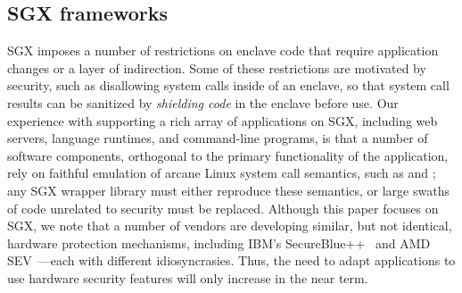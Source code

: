 \begin{comment}
Unfortunately, the limited POSIX support in the \sdk{} infrastructure really strikes
the opportunity of fine-grained partitioning.
The lack of POSIX APIs in the infrastructure is fundamental, due to the restriction
on OS interaction from the enclaves.
The missing APIs encapsulates system calls, which can expose the enclave to some risky OS interaction model, such as {\bf Iago Attacks}~\cite{checkoway13iago}.


\end{comment}

\subsection{SGX frameworks}
\label{sec:sgx:background:design}




SGX imposes a number of restrictions on enclave code 
that require application changes
or a layer of indirection. %
Some of these restrictions are motivated by security, such as disallowing system calls
inside of an enclave, so that system call results can be sanitized by {\em shielding code} in the enclave before use.
Our experience with supporting a rich array of applications on SGX, including web servers, language runtimes, and
command-line programs,
is that
a number of software components,
orthogonal to the primary functionality of the application,
rely on faithful emulation of arcane Linux system call semantics, such as  and ;
any SGX wrapper library must either reproduce these semantics, or large swaths of code unrelated to security
must be replaced.
Although this paper focuses on SGX, we note that a number of vendors are developing similar, but not identical,
hardware protection mechanisms, including IBM's SecureBlue++~\cite{secureblue++} and AMD SEV~\cite{amd-sme}---each
with different idiosyncrasies.
Thus, the need to adapt applications to use hardware security features
will only increase in the near term.

